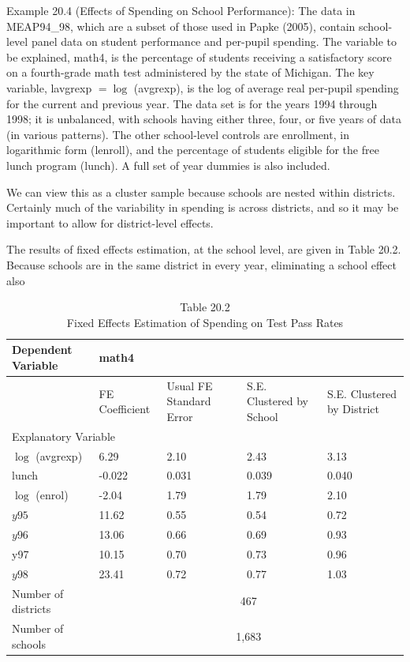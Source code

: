 \documentclass[10pt]{article}
\begin{document}
Example 20.4 (Effects of Spending on School Performance): The data in MEAP94\_98, which are a subset of those used in Papke (2005), contain school-level panel data on student performance and per-pupil spending. The variable to be explained, math4, is the percentage of students receiving a satisfactory score on a fourth-grade math test administered by the state of Michigan. The key variable, lavgrexp $=\log$ (avgrexp), is the log of average real per-pupil spending for the current and previous year. The data set is for the years 1994 through 1998; it is unbalanced, with schools having either three, four, or five years of data (in various patterns). The other school-level controls are enrollment, in logarithmic form (lenroll), and the percentage of students eligible for the free lunch program (lunch). A full set of year dummies is also included.

We can view this as a cluster sample because schools are nested within districts. Certainly much of the variability in spending is across districts, and so it may be important to allow for district-level effects.

The results of fixed effects estimation, at the school level, are given in Table 20.2. Because schools are in the same district in every year, eliminating a school effect also

\begin{table}[h]
\begin{center}
\captionsetup{labelformat=empty}
\caption{Table 20.2\\
Fixed Effects Estimation of Spending on Test Pass Rates}
\begin{tabular}{|l|l|l|l|l|}
\hline
\multirow[t]{2}{*}{Dependent Variable} & \multicolumn{4}{|l|}{math4} \\
\hline
 & FE Coefficient & Usual FE Standard Error & S.E. Clustered by School & S.E. Clustered by District \\
\hline
\multicolumn{5}{|l|}{Explanatory Variable} \\
\hline
$\log$ (avgrexp) & 6.29 & 2.10 & 2.43 & 3.13 \\
\hline
lunch & -0.022 & 0.031 & 0.039 & 0.040 \\
\hline
$\log$ (enrol) & -2.04 & 1.79 & 1.79 & 2.10 \\
\hline
$y 95$ & 11.62 & 0.55 & 0.54 & 0.72 \\
\hline
$y 96$ & 13.06 & 0.66 & 0.69 & 0.93 \\
\hline
y97 & 10.15 & 0.70 & 0.73 & 0.96 \\
\hline
$y 98$ & 23.41 & 0.72 & 0.77 & 1.03 \\
\hline
Number of districts & \multicolumn{4}{|c|}{467} \\
\hline
Number of schools & \multicolumn{4}{|c|}{1,683} \\
\hline
\end{tabular}
\end{center}
\end{table}
\end{document}
